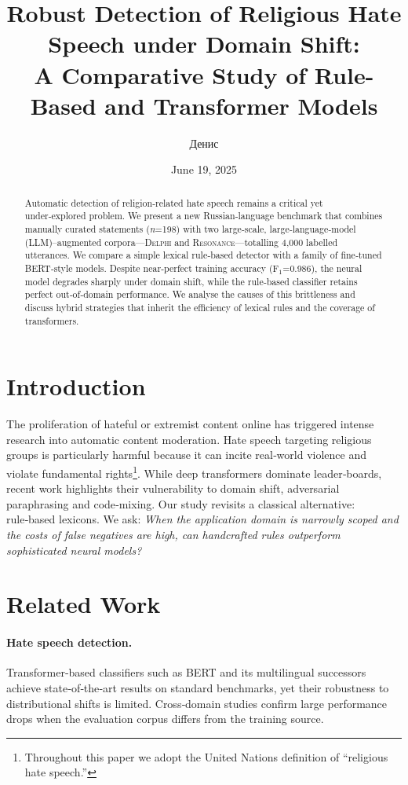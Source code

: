 \documentclass{article}
\title{Robust Detection of Religious Hate Speech under Domain Shift:\\ A Comparative Study of Rule-Based and Transformer Models}
\author{Денис}
\date{June 19, 2025}
\begin{document}
\maketitle

\begin{abstract}
Automatic detection of religion‑related hate speech remains a critical yet under‑explored problem. We present a new Russian‑language benchmark that combines manually curated statements (\textit{n}=198) with two large‑scale, large‑language‑model (LLM)–augmented corpora—\textsc{Delphi} and \textsc{Resonance}—totalling 4,000 labelled utterances. We compare a simple lexical rule‑based detector with a family of fine‑tuned \textsc{BERT}‑style models. Despite near‑perfect training accuracy (F$_1$=0.986), the neural model degrades sharply under domain shift, while the rule‑based classifier retains perfect out‑of‑domain performance. We analyse the causes of this brittleness and discuss hybrid strategies that inherit the efficiency of lexical rules and the coverage of transformers.
\end{abstract}

\section{Introduction}
The proliferation of hateful or extremist content online has triggered intense research into automatic content moderation. Hate speech targeting religious groups is particularly harmful because it can incite real‑world violence and violate fundamental rights\footnote{Throughout this paper we adopt the United Nations definition of ``religious hate speech.''}. While deep transformers dominate leader‑boards, recent work highlights their vulnerability to domain shift, adversarial paraphrasing and code‑mixing\cite{nasir2023cross}. Our study revisits a classical alternative: rule‑based lexicons. We ask: \emph{When the application domain is narrowly scoped and the costs of false negatives are high, can handcrafted rules outperform sophisticated neural models?}

\section{Related Work}
\paragraph{Hate speech detection.} Transformer‑based classifiers such as BERT and its multilingual successors achieve state‑of‑the‑art results on standard benchmarks\cite{rethinking2025}, yet their robustness to distributional shifts is limited\cite{fair2024}. Cross‑domain studies confirm large performance drops when the evaluation corpus differs from the training source\cite{yinn2023emotion}.
\end{document}
